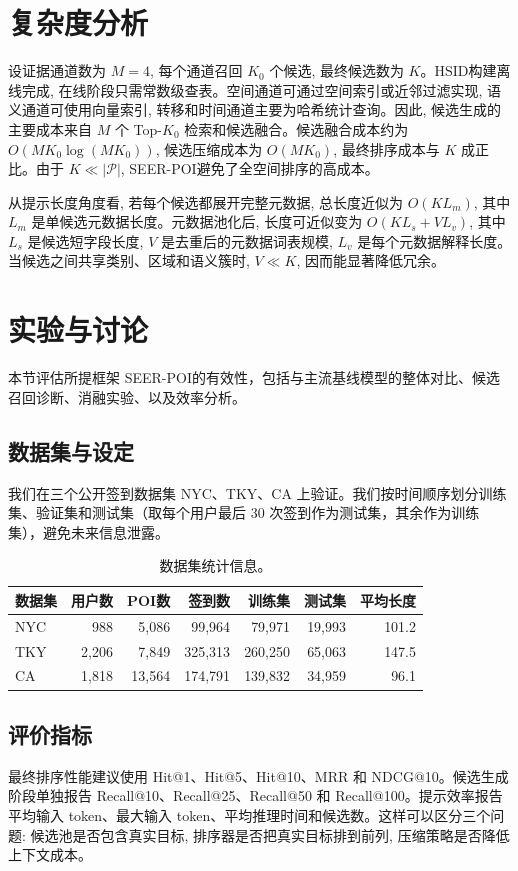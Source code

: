 \documentclass[10pt,twocolumn,fontset=none]{ctexart}
\newcommand{\method}{SEER-POI}
\newcommand{\hsid}{HSID}
\begin{document}
\section{复杂度分析}

设证据通道数为 $M=4$, 每个通道召回 $K_0$ 个候选, 最终候选数为 $K$。\hsid 构建离线完成, 在线阶段只需常数级查表。空间通道可通过空间索引或近邻过滤实现, 语义通道可使用向量索引, 转移和时间通道主要为哈希统计查询。因此, 候选生成的主要成本来自 $M$ 个 Top-$K_0$ 检索和候选融合。候选融合成本约为 $O(MK_0\log(MK_0))$, 候选压缩成本为 $O(MK_0)$, 最终排序成本与 $K$ 成正比。由于 $K\ll |\mathcal P|$, \method 避免了全空间排序的高成本。

从提示长度角度看, 若每个候选都展开完整元数据, 总长度近似为 $O(KL_m)$, 其中 $L_m$ 是单候选元数据长度。元数据池化后, 长度可近似变为 $O(KL_s+VL_v)$, 其中 $L_s$ 是候选短字段长度, $V$ 是去重后的元数据词表规模, $L_v$ 是每个元数据解释长度。当候选之间共享类别、区域和语义簇时, $V\ll K$, 因而能显著降低冗余。

\section{实验与讨论}
本节评估所提框架 \method 的有效性，包括与主流基线模型的整体对比、候选召回诊断、消融实验、以及效率分析。

\subsection{数据集与设定}
我们在三个公开签到数据集 NYC、TKY、CA 上验证。我们按时间顺序划分训练集、验证集和测试集（取每个用户最后 30 次签到作为测试集，其余作为训练集），避免未来信息泄露。

\begin{table}[h]
\centering
\caption{数据集统计信息。}
\label{tab:dataset}
\small
\begin{tabular}{lrrrrrr}
\toprule
数据集 & 用户数 & POI数 & 签到数 & 训练集 & 测试集 & 平均长度 \\
\midrule
NYC & 988 & 5,086 & 99,964 & 79,971 & 19,993 & 101.2 \\
TKY & 2,206 & 7,849 & 325,313 & 260,250 & 65,063 & 147.5 \\
CA  & 1,818 & 13,564 & 174,791 & 139,832 & 34,959 & 96.1 \\
\bottomrule
\end{tabular}
\end{table}

\subsection{评价指标}
最终排序性能建议使用 Hit@1、Hit@5、Hit@10、MRR 和 NDCG@10。候选生成阶段单独报告 Recall@10、Recall@25、Recall@50 和 Recall@100。提示效率报告平均输入 token、最大输入 token、平均推理时间和候选数。这样可以区分三个问题: 候选池是否包含真实目标, 排序器是否把真实目标排到前列, 压缩策略是否降低上下文成本。
\end{document}
